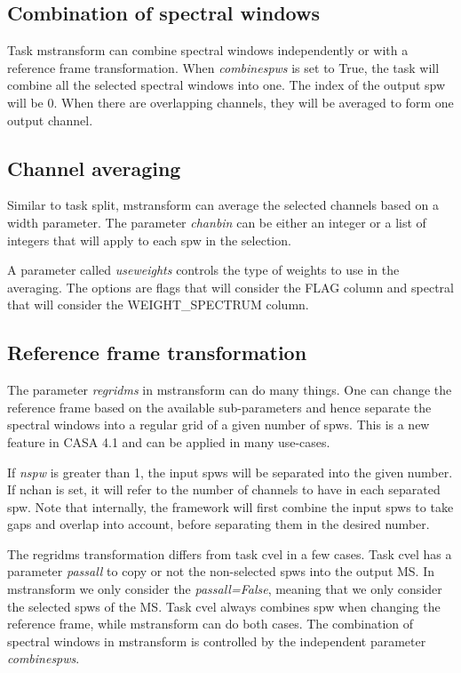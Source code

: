 
\subsection{Combination of spectral windows}
Task mstransform can combine spectral windows independently or
with a reference frame transformation. When {\it combinespws} is set to True, the task will
combine all the selected spectral windows into one. The index of the output spw
will be 0. When there are overlapping channels, they will be averaged to form one
output channel.

\subsection{Channel averaging}
Similar to task split, mstransform can average the selected channels based on a
width parameter. The parameter {\it chanbin} can be either an integer or a list of
integers that will apply to each spw in the selection.

A parameter called {\it useweights} controls the type of weights to use in the
averaging. The options are flags that will consider the FLAG column and spectral
that will consider the WEIGHT_SPECTRUM column.


\subsection{Reference frame transformation}
The parameter {\it regridms} in mstransform can do many things. One can change the
reference frame based on the available sub-parameters and hence separate the spectral
windows into a regular grid of a given number of spws. This is a new feature in CASA
4.1 and can be applied in many use-cases. %

If {\it nspw} is greater than 1, the input spws will be separated into the given
number. If nchan is set, it will refer to the number of channels to have in each
separated spw. Note that internally, the framework will first combine the input
spws to take gaps and overlap into account, before separating them in the desired
number.

The regridms transformation differs from task cvel in a few cases. Task cvel has a
parameter {\it passall} to copy or not the non-selected spws into the output MS. In 
mstransform we only consider the {\it passall=False}, meaning that we only consider the
selected spws of the MS. Task cvel always combines spw when changing the reference
frame, while mstransform can do both cases. The combination of spectral windows in mstransform
is controlled by the independent parameter {\it combinespws}.

